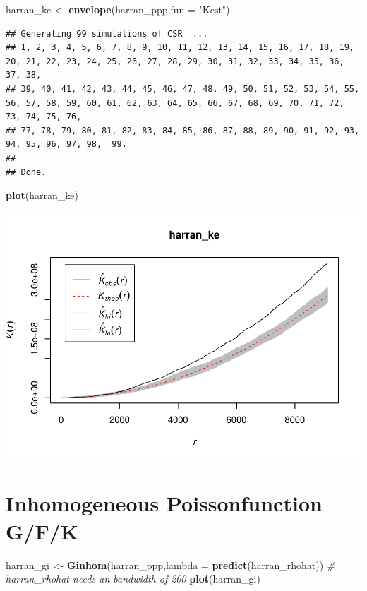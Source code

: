 \documentclass[]{article}
\newenvironment{Shaded}{\begin{snugshade}}{\end{snugshade}}
\newcommand{\KeywordTok}[1]{\textcolor[rgb]{0.13,0.29,0.53}{\textbf{{#1}}}}
\newcommand{\DataTypeTok}[1]{\textcolor[rgb]{0.13,0.29,0.53}{{#1}}}
\newcommand{\StringTok}[1]{\textcolor[rgb]{0.31,0.60,0.02}{{#1}}}
\newcommand{\CommentTok}[1]{\textcolor[rgb]{0.56,0.35,0.01}{\textit{{#1}}}}
\newcommand{\NormalTok}[1]{{#1}}
\begin{document}
\begin{Shaded}
\begin{Highlighting}[]
\NormalTok{harran_ke <-}\StringTok{ }\KeywordTok{envelope}\NormalTok{(harran_ppp,}\DataTypeTok{fun =} \StringTok{"Kest"}\NormalTok{)}
\end{Highlighting}
\end{Shaded}

\begin{verbatim}
## Generating 99 simulations of CSR  ...
## 1, 2, 3, 4, 5, 6, 7, 8, 9, 10, 11, 12, 13, 14, 15, 16, 17, 18, 19, 20, 21, 22, 23, 24, 25, 26, 27, 28, 29, 30, 31, 32, 33, 34, 35, 36, 37, 38,
## 39, 40, 41, 42, 43, 44, 45, 46, 47, 48, 49, 50, 51, 52, 53, 54, 55, 56, 57, 58, 59, 60, 61, 62, 63, 64, 65, 66, 67, 68, 69, 70, 71, 72, 73, 74, 75, 76,
## 77, 78, 79, 80, 81, 82, 83, 84, 85, 86, 87, 88, 89, 90, 91, 92, 93, 94, 95, 96, 97, 98,  99.
## 
## Done.
\end{verbatim}

\begin{Shaded}
\begin{Highlighting}[]
\KeywordTok{plot}\NormalTok{(harran_ke) }
\end{Highlighting}
\end{Shaded}

\includegraphics{HarranPlain_files/figure-latex/unnamed-chunk-10-4.pdf}

\section{Inhomogeneous Poissonfunction
G/F/K}\label{inhomogeneous-poissonfunction-gfk}

\begin{Shaded}
\begin{Highlighting}[]
\NormalTok{harran_gi <-}\StringTok{ }\KeywordTok{Ginhom}\NormalTok{(harran_ppp,}\DataTypeTok{lambda =} \KeywordTok{predict}\NormalTok{(harran_rhohat)) }\CommentTok{# harran_rhohat needs an bandwidth of 200}
\KeywordTok{plot}\NormalTok{(harran_gi)}
\end{Highlighting}
\end{Shaded}
\end{document}
